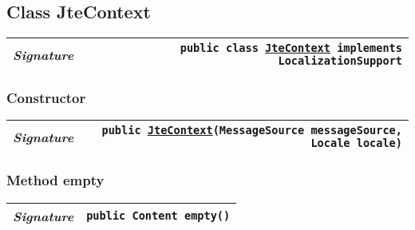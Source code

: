 \begin{adjustwidth}{1.5em}{0pt}
\begin{adjustwidth}{1.5em}{0pt}
\begin{adjustwidth}{1.5em}{0pt}
{\begin{tabularx}{1.0\linewidth}{@{}l R@{}}
      \end{tabularx}}
    \end{adjustwidth}
  \end{adjustwidth}\subsection{Class JteContext\label{edu.kit.hci.soli.config.template.JteContext} }
  \begin{adjustwidth}{1.5em}{0pt}
    {\begin{tabularx}{1.0\linewidth}{@{}l R@{}}
      \emph{Signature} & \texttt{public  class \texttt{\hyperref[edu.kit.hci.soli.config.template.JteContext]{\texttt{JteContext}} implements \texttt{LocalizationSupport}}} \\
      \hline
  
    \end{tabularx}}\subsubsection{Constructor\label{edu.kit.hci.soli.config.template.JteContext@edu.kit.hci.soli.config.template.JteContext(org.springframework.context.MessageSource,java.util.Locale)}}
    \begin{adjustwidth}{1.5em}{0pt}
      {\begin{tabularx}{1.0\linewidth}{@{}l R@{}}
        \emph{Signature} & \texttt{public \texttt{\hyperref[edu.kit.hci.soli.config.template.JteContext]{\texttt{JteContext}}}(\texttt{MessageSource} messageSource, \texttt{Locale} locale)} \\
        \hline
  
      \end{tabularx}}
    \end{adjustwidth}\subsubsection{Method empty\label{edu.kit.hci.soli.config.template.JteContext@empty()}}
    \begin{adjustwidth}{1.5em}{0pt}
      {\begin{tabularx}{1.0\linewidth}{@{}l R@{}}
        \emph{Signature} & \texttt{public \texttt{Content} empty()} \\
        \hline
  

\end{tabularx}}
\end{adjustwidth}
\end{adjustwidth}
\end{adjustwidth}
